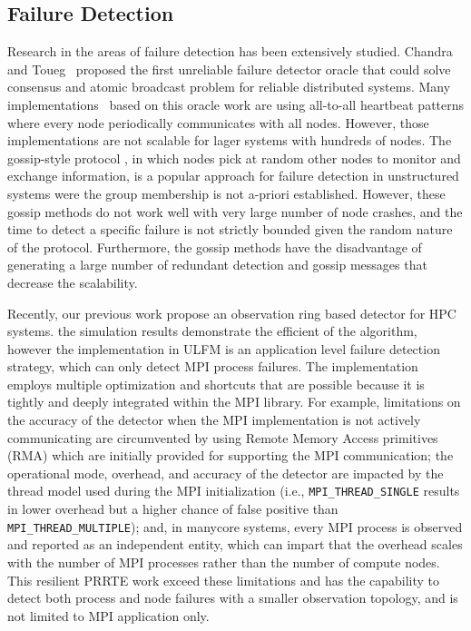 \documentclass[sigconf]{acmart}
\newcommand{\mpifunc}[1]{\lstinline"MPI_#1"\xspace}
\newcommand{\prrte}[0]{\textsc{PRRTE}\xspace}
\newcommand{\ulfm}[0]{\textsc{ULFM}\xspace}
\newcommand{\mpi}[0]{\textsc{MPI}\xspace}
\begin{document}
\subsection{Failure Detection}
Research in the areas of failure detection has been extensively studied. Chandra and Toueg~\cite{Chandra96} proposed the first unreliable failure detector oracle that could solve consensus and atomic broadcast problem for reliable distributed systems. Many implementations~\cite{Wei02, Larrea00, Kawazoe97} based on this oracle work are using all-to-all heartbeat patterns where every node periodically communicates with all nodes. However, those implementations are not scalable for lager systems with hundreds of nodes. The gossip-style protocol \cite{van98, Ranganathan01, Gupta01, Abhinandan02}, in which nodes pick at random other nodes to monitor and exchange information, is a popular approach for failure detection in unstructured systems were the group membership 
is not a-priori established. However, these gossip methods do not work well with very large number of node crashes, and the time to detect a specific failure is not strictly bounded given the 
random nature of the protocol. Furthermore, the gossip methods have the disadvantage of 
generating a large number of redundant detection and gossip messages that decrease the scalability.

Recently, our previous work \cite{George16} propose an observation ring based detector for HPC systems. 
the simulation results demonstrate the efficient of the algorithm, however the implementation in \ulfm is an application level failure detection strategy, which can only detect \mpi process failures. The 
implementation employs multiple optimization and shortcuts that are possible because it is 
tightly and deeply integrated within the \mpi library. For example, limitations on the 
accuracy of the detector when the \mpi implementation is not actively communicating 
are circumvented by using Remote Memory Access primitives (RMA) which are
initially provided for supporting the \mpi communication; the operational 
mode, overhead, and accuracy of the detector are impacted by the thread model used 
during the \mpi initialization (i.e., \mpifunc{THREAD_SINGLE} results 
in lower overhead but a higher chance of false positive than \mpifunc{THREAD_MULTIPLE}); 
and, in manycore systems, every \mpi process 
is observed and reported as an independent entity, which can impart that the 
overhead scales with the number of \mpi processes rather than the number of 
compute nodes. This resilient \prrte work 
exceed these limitations and has the capability to detect both process and 
node failures with a smaller observation topology, and is not limited to
MPI application only. 
\end{document}
